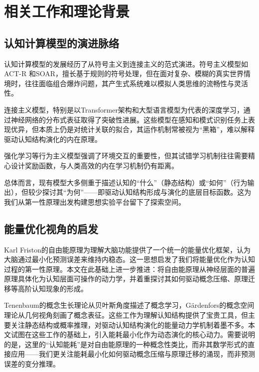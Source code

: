 \documentclass[12pt,a4paper]{article}
\begin{document}
\section{相关工作和理论背景}

\subsection{认知计算模型的演进脉络}

认知计算模型的发展经历了从符号主义到连接主义的范式演进。符号主义模型如ACT-R \cite{anderson2004act} 和SOAR，擅长基于规则的符号处理，但在面对复杂、模糊的真实世界情境时，往往面临组合爆炸问题，其产生式系统难以模拟人类思维的流畅性与灵活性。

连接主义模型，特别是以Transformer架构\cite{vaswani2017attention}和大型语言模型为代表的深度学习\cite{lecun2015deep}，通过神经网络的分布式表征取得了突破性进展。这些模型在感知和模式识别任务上表现优异，但本质上仍是对统计关联的拟合，其运作机制常被视为“黑箱”，难以解释驱动认知结构演化的内在原理。

强化学习\cite{sutton2018reinforcement}等行为主义模型强调了环境交互的重要性，但其试错学习机制往往需要精心设计奖励函数，与人类高效的内在学习机制仍有距离。

总体而言，现有模型大多侧重于描述认知的“什么”（静态结构）或“如何”（行为输出），但较少探讨其“为何”——即驱动认知结构形成与演化的底层目标函数。这为我们从第一性原理出发构建思想实验平台留下了探索空间。

\subsection{能量优化视角的启发}

Karl Friston的自由能原理\cite{friston2010free}为理解大脑功能提供了一个统一的能量优化框架，认为大脑通过最小化预测误差来维持内稳态。这一思想启发了我们将能量优化作为认知过程的第一性原理。本文在此基础上进一步推进：将自由能原理从神经层面的普遍原理具体化为认知层面可操作的动力学，并着重探讨其如何驱动概念压缩、原理迁移等高阶认知现象的形成。

Tenenbaum的概念生长理论\cite{tenenbaum2011grow}从贝叶斯角度描述了概念学习，Gärdenfors的概念空间理论\cite{gardenfors2004conceptual}从几何视角刻画了概念表征。这些工作为理解认知结构提供了宝贵工具，但主要关注静态结构或概率推理，对驱动认知结构演化的能量动力学机制着墨不多。本文试图在这些工作的基础上，引入能耗最小化作为动态演化的核心动力。需要说明的是，这里的“认知能耗”是对自由能原理的一种概念性类比，而非其数学形式的直接应用——我们更关注能耗最小化如何驱动概念压缩与原理迁移的涌现，而非预测误差的变分推理。
\end{document}
